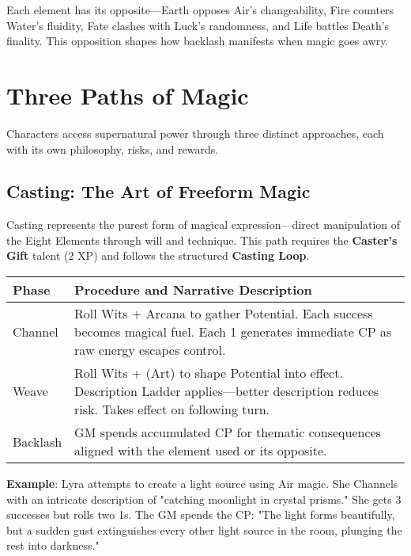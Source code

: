 Each element has its opposite—Earth opposes Air's changeability, Fire counters Water's fluidity, Fate clashes with Luck's randomness, and Life battles Death's finality. This opposition shapes how backlash manifests when magic goes awry.

\section*{Three Paths of Magic}

Characters access supernatural power through three distinct approaches, each with its own philosophy, risks, and rewards.

\subsection*{Casting: The Art of Freeform Magic}

Casting represents the purest form of magical expression—direct manipulation of the Eight Elements through will and technique. This path requires the \textbf{Caster's Gift} talent (2 XP) and follows the structured \textbf{Casting Loop}.

\begin{fatebox}
\begin{tabularx}{\textwidth}{lp{}}
\toprule
\textbf{Phase} & \textbf{Procedure and Narrative Description} \\
\midrule
Channel & Roll Wits + Arcana to gather Potential. Each success becomes magical fuel. Each 1 generates immediate CP as raw energy escapes control. \\
Weave & Roll Wits + (Art) to shape Potential into effect. Description Ladder applies—better description reduces risk. Takes effect on following turn. \\
Backlash & GM spends accumulated CP for thematic consequences aligned with the element used or its opposite. \\
\bottomrule
\end{tabularx}
\end{fatebox}

\textbf{Example}: Lyra attempts to create a light source using Air magic. She Channels with an intricate description of "catching moonlight in crystal prisms." She gets 3 successes but rolls two 1s. The GM spends the CP: "The light forms beautifully, but a sudden gust extinguishes every other light source in the room, plunging the rest into darkness."

